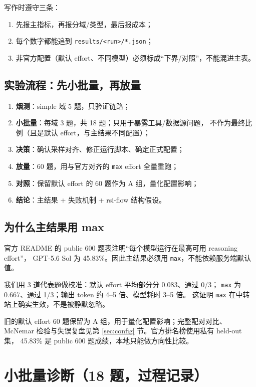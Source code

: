\documentclass[UTF8,a4paper,11pt]{ctexart}
\begin{document}
写作时遵守三条：

\begin{enumerate}
  \item 先报主指标，再报分域/类型，最后报成本；
  \item 每个数字都能追到 \texttt{results/<run>/*.json}；
  \item 非官方配置（默认 effort、不同模型）必须标成“下界/对照”，不能混进主表。
\end{enumerate}

\subsection{实验流程：先小批量，再放量}

\begin{enumerate}
  \item \textbf{烟测}：simple 域 5 题，只验证链路；
  \item \textbf{小批量}：每域 3 题，共 18 题；只用于暴露工具/数据源问题，
  不作为最终比例（且是默认 effort，与主结果不同配置）；
  \item \textbf{决策}：确认采样对齐、修正运行脚本、确定正式配置；
  \item \textbf{放量}：60 题，用与官方对齐的 \texttt{max} effort 全量重跑；
  \item \textbf{对照}：保留默认 effort 的 60 题作为 A 组，量化配置影响；
  \item \textbf{结论}：主结果 + 失败机制 + rsi-flow 结构假设。
\end{enumerate}

\subsection{为什么主结果用 max}

官方 README 的 public 600 题表注明“每个模型运行在最高可用 reasoning effort”，
GPT-5.6 Sol 为 45.83\%。因此主结果必须用 \texttt{max}，不能依赖服务端默认值。

我们用 3 道代表题做校准：默认 effort 平均部分分 0.083、通过 0/3；
\texttt{max} 为 0.667、通过 1/3；输出 token 约 4--5 倍、模型耗时 3--5 倍。
这证明 \texttt{max} 在中转站上确实生效，不是被静默忽略。

旧的默认 effort 60 题保留为 A 组，用于量化配置影响；完整配对对比、
McNemar 检验与失误复盘见第 \ref{sec:config} 节。官方排名榜使用私有 held-out 集，
45.83\% 是 public 600 题成绩，本地只能做方向性比较。

\section{小批量诊断（18 题，过程记录）}
\label{sec:small}
\end{document}
